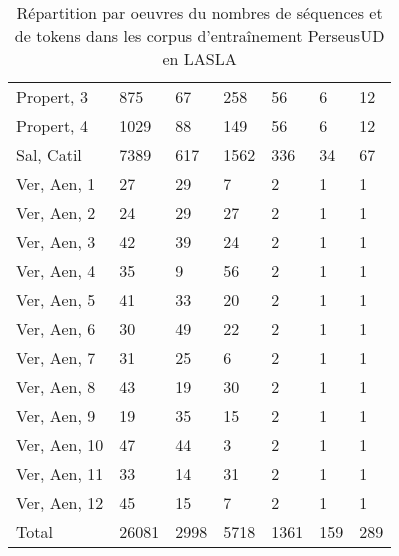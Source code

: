 \begin{table}[h]
\begin{tabular}{l|lll|lll}
 Propert, 3   & 875    & 67   & 258  & 56     & 6   & 12   \\
 Propert, 4   & 1029   & 88   & 149  & 56     & 6   & 12   \\
 Sal, Catil   & 7389   & 617  & 1562 & 336    & 34  & 67   \\
 Ver, Aen, 1  & 27     & 29   & 7    & 2      & 1   & 1    \\
 Ver, Aen, 2  & 24     & 29   & 27   & 2      & 1   & 1    \\
 Ver, Aen, 3  & 42     & 39   & 24   & 2      & 1   & 1    \\
 Ver, Aen, 4  & 35     & 9    & 56   & 2      & 1   & 1    \\
 Ver, Aen, 5  & 41     & 33   & 20   & 2      & 1   & 1    \\
 Ver, Aen, 6  & 30     & 49   & 22   & 2      & 1   & 1    \\
 Ver, Aen, 7  & 31     & 25   & 6    & 2      & 1   & 1    \\
 Ver, Aen, 8  & 43     & 19   & 30   & 2      & 1   & 1    \\
 Ver, Aen, 9  & 19     & 35   & 15   & 2      & 1   & 1    \\
 Ver, Aen, 10 & 47     & 44   & 3    & 2      & 1   & 1    \\
 Ver, Aen, 11 & 33     & 14   & 31   & 2      & 1   & 1    \\
 Ver, Aen, 12 & 45     & 15   & 7    & 2      & 1   & 1    \\ \midrule
 Total        & 26081  & 2998 & 5718 & 1361   & 159 & 289  \\ \bottomrule
\hline
\end{tabular}
\caption{Répartition par oeuvres du nombres de séquences et de tokens dans les corpus d'entraînement PerseusUD en LASLA}
\label{table:lasla:perseus-ud}
\end{table}
